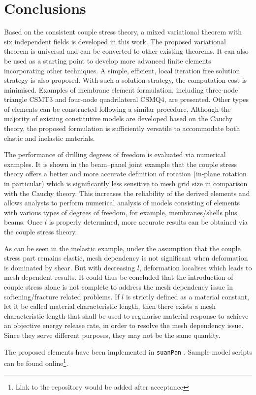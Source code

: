 \documentclass[3p,sort&compress,11pt,fleqn,review]{elsarticle}
\begin{document}
\section{Conclusions}
Based on the consistent couple stress theory, a mixed variational theorem with six independent fields is developed in this work. \alert{The proposed variational theorem is universal and can be converted to other existing theorems. It can also be used as a starting point to develop more advanced finite elements incorporating other techniques.} A simple, efficient, local iteration free solution strategy is also proposed. \alert{With such a solution strategy, the computation cost is minimised.} Examples of membrane element formulation, including three-node triangle CSMT3 and four-node quadrilateral CSMQ4, are presented. Other types of elements can be constructed following a similar procedure. Although the majority of existing constitutive models are developed based on the Cauchy theory, the proposed formulation is sufficiently versatile to accommodate both elastic and inelastic materials.

The performance of drilling degrees of freedom is evaluated via numerical examples. It is shown in the beam--panel joint example that the couple stress theory offers a better \alert{and more accurate} definition of rotation (in-plane rotation in particular) which is significantly less sensitive to mesh grid size \alert{in comparison with the Cauchy theory}. This \alert{increases the reliability of the derived elements and} allows analysts to perform numerical analysis of models consisting of elements with various types of degrees of freedom\alert{, for example, membranes/shells plus beams}. Once $l$ is properly determined, more accurate results can be obtained via the couple stress theory.

\alert{As can be seen in the inelastic example, under the assumption that the couple stress part remains elastic, mesh dependency is not significant when deformation is dominated by shear. But with decreasing $l$, deformation localises which leads to mesh dependent results.} It could thus be concluded that the introduction of couple stress alone is not complete to address the mesh dependency issue in softening/fracture related problems. If $l$ is strictly defined as a material constant, let it be called material characteristic length, then there exists a mesh characteristic length that shall be used to regularise material response to achieve an objective energy release rate\alert{, in order to resolve the mesh dependency issue}. Since they serve different purposes, they may not be the same quantity.

The proposed elements have been implemented in \texttt{suanPan} \citep{Chang2021}. Sample model scripts can be found online\footnote{Link to the repository would be added after acceptance}.


\end{document}
